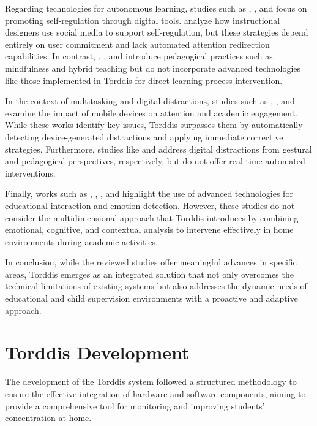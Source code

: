 			Regarding technologies for autonomous learning, studies such as \cite{Bembich2016Future}, \cite{Roberts2020Task}, and \cite{Peters2003Self} focus on promoting self-regulation through digital tools. \cite{Muljana2022Instructional} analyze how instructional designers use social media to support self-regulation, but these strategies depend entirely on user commitment and lack automated attention redirection capabilities. In contrast, \cite{Palmer2022impact}, \cite{Adcroft2018Developing}, and \cite{Salter2014Exploring} introduce pedagogical practices such as mindfulness and hybrid teaching but do not incorporate advanced technologies like those implemented in Torddis for direct learning process intervention.
			
			In the context of multitasking and digital distractions, studies such as \cite{Hartley2022Smartphone}, \cite{Labar2019Interplay}, and \cite{Farsani2020} examine the impact of mobile devices on attention and academic engagement. While these works identify key issues, Torddis surpasses them by automatically detecting device-generated distractions and applying immediate corrective strategies. Furthermore, studies like \cite{Erazo2016Easing} and \cite{Wang2022Empowering} address digital distractions from gestural and pedagogical perspectives, respectively, but do not offer real-time automated interventions.
			
			Finally, works such as \cite{Kulkarni2023}, \cite{Enadula2021}, \cite{Ozdamli2022}, and \cite{Warren2015Brief} highlight the use of advanced technologies for educational interaction and emotion detection. However, these studies do not consider the multidimensional approach that Torddis introduces by combining emotional, cognitive, and contextual analysis to intervene effectively in home environments during academic activities.
			
			In conclusion, while the reviewed studies offer meaningful advances in specific areas, Torddis emerges as an integrated solution that not only overcomes the technical limitations of existing systems but also addresses the dynamic needs of educational and child supervision environments with a proactive and adaptive approach.
	
	\section{Torddis Development}
	\label{section:fourth}
		The development of the Torddis system followed a structured methodology to ensure the effective integration of hardware and software components, aiming to provide a comprehensive tool for monitoring and improving students’ concentration at home.
		
